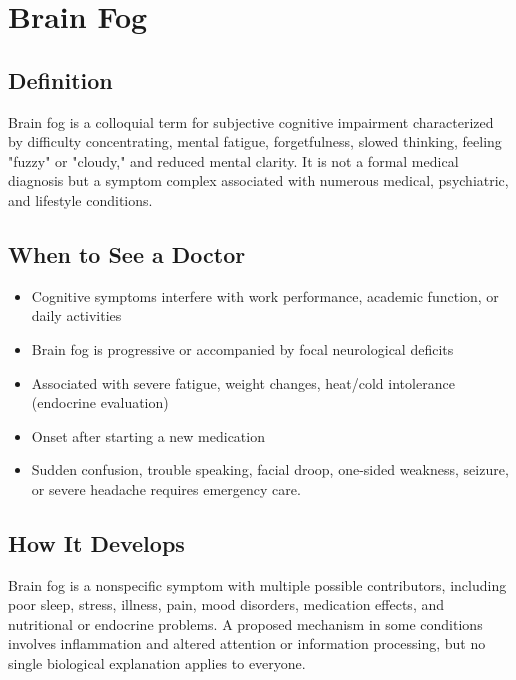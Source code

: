 \chapter{Brain Fog}

\section*{Definition}
Brain fog is a colloquial term for subjective cognitive impairment characterized by difficulty concentrating, mental fatigue, forgetfulness, slowed thinking, feeling "fuzzy" or "cloudy," and reduced mental clarity. It is not a formal medical diagnosis but a symptom complex associated with numerous medical, psychiatric, and lifestyle conditions.

\section*{When to See a Doctor}

\begin{itemize}
 \item Cognitive symptoms interfere with work performance, academic function, or daily activities
 \item Brain fog is progressive or accompanied by focal neurological deficits
 \item Associated with severe fatigue, weight changes, heat/cold intolerance (endocrine evaluation)
 \item Onset after starting a new medication
 \item Sudden confusion, trouble speaking, facial droop, one-sided weakness, seizure, or severe headache requires emergency care.
\end{itemize}

\section*{How It Develops}
Brain fog is a nonspecific symptom with multiple possible contributors, including poor sleep, stress, illness, pain, mood disorders, medication effects, and nutritional or endocrine problems. A proposed mechanism in some conditions involves inflammation and altered attention or information processing, but no single biological explanation applies to everyone.

